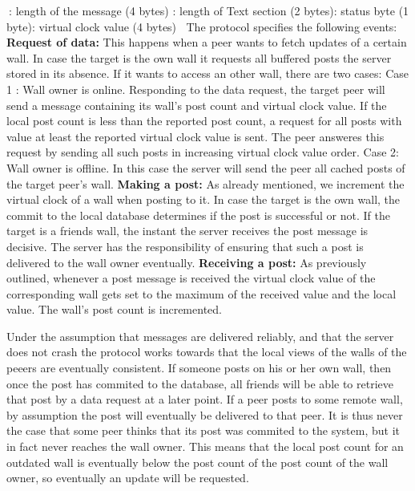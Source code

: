 \documentclass{report}
\begin{document}
\vspace{-3mm}
$\:$: length of the message (4 bytes) : length of Text section (2 bytes): status byte (1 byte): virtual clock value (4 bytes)\newline
$\:$\newline
The protocol specifies the following events:\newline
\textbf{Request of data:} This happens when a peer wants to fetch updates of a certain wall.  
In case the target is the own wall it requests all buffered posts the server stored in its absence.
If it wants to access an other wall, there are two cases:\newline
Case 1 : Wall owner is online.
Responding to the data request, the target peer will send a message containing its wall's post count and virtual clock value. If the local post count is less than the reported post count, a request for all posts with value at least the reported virtual clock value is sent. The peer answeres this request by sending all such posts in increasing virtual clock value order. \newline
Case 2: Wall owner is offline.
In this case the server will send the peer all cached posts of the target peer's wall.\newline
\textbf{Making a post:}
As already mentioned, we increment the virtual clock of a wall when posting to it.\newline
In case the target is the own wall, the commit to the local database determines if the post is successful or not.
If the target is a friends wall, the instant the server receives the post message is decisive. The server has the responsibility of ensuring that such a post is delivered to the wall owner eventually. \newline
\textbf{Receiving a post:}
As previously outlined, whenever a post message is received the virtual clock value of the corresponding wall gets set to the maximum of the received value and the local value.  The wall's post count is incremented.

Under the assumption that messages are delivered reliably, and that the server does not crash the protocol works towards that the local views of the walls of the peeers are eventually consistent.  If someone posts on his or her own wall, then once the post has commited to the database, all friends will be able to retrieve that post by a data request at a later point. If a peer posts to some remote wall, by assumption the post will eventually be delivered to that peer. It is thus never the case that some peer thinks that its post was commited to the system, but it in fact never reaches the wall owner. This means that the local post count for an outdated wall is eventually below the post count of the post count of the wall owner, so eventually an update will be requested.
\end{document}
